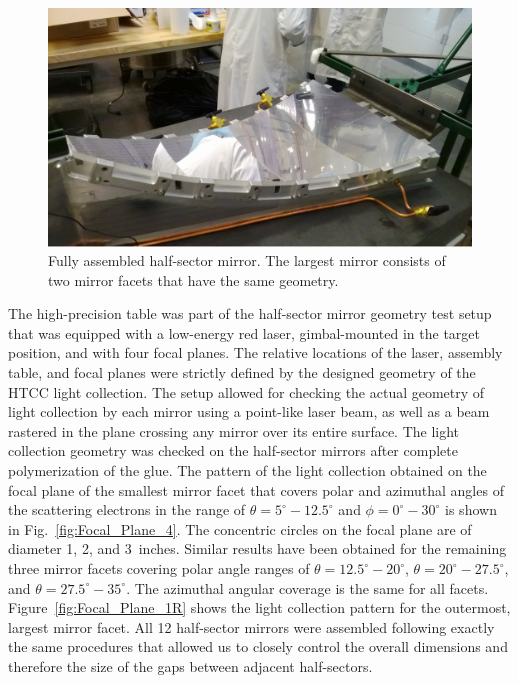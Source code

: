 \begin{figure}[ht]
    \centering
    \includegraphics[width=1.0\linewidth]{images/Half-sector.png}
    \caption{Fully assembled half-sector mirror. The largest mirror consists of two mirror facets that have the
      same geometry.}
    \label{fig:Half-sector}
\end{figure}

The high-precision table was part of the half-sector mirror geometry test setup that was equipped with a
low-energy red laser, gimbal-mounted in the target position, and with four focal planes. The relative locations
of the laser, assembly table, and focal planes were strictly defined by the designed geometry of the HTCC
light collection. The setup allowed for checking the actual geometry of light collection by each mirror using a
point-like laser beam, as well as a beam rastered in the plane crossing any mirror over its entire surface. The
light collection geometry was checked on the half-sector mirrors after complete polymerization of the glue.
The pattern of the light collection obtained on the focal plane of the smallest mirror facet that covers polar and
azimuthal angles of the scattering electrons in the range of $\theta = 5^\circ - 12.5^\circ$ and
$\phi = 0^\circ - 30^\circ$ is shown in Fig.~\ref{fig:Focal_Plane_4}. The concentric circles on the focal plane
are of diameter 1, 2, and 3~inches. Similar results have been obtained for the remaining three mirror facets
covering polar angle ranges of $\theta = 12.5^\circ - 20^\circ$, $\theta = 20^\circ - 27.5^\circ$, and
$\theta = 27.5^\circ - 35^\circ$. The azimuthal angular coverage is the same for all facets.
Figure~\ref{fig:Focal_Plane_1R} shows the light collection pattern for the outermost, largest mirror facet.
All 12 half-sector mirrors were assembled following exactly the same procedures that allowed us to closely
control the overall dimensions and therefore the size of the gaps between adjacent half-sectors. 

